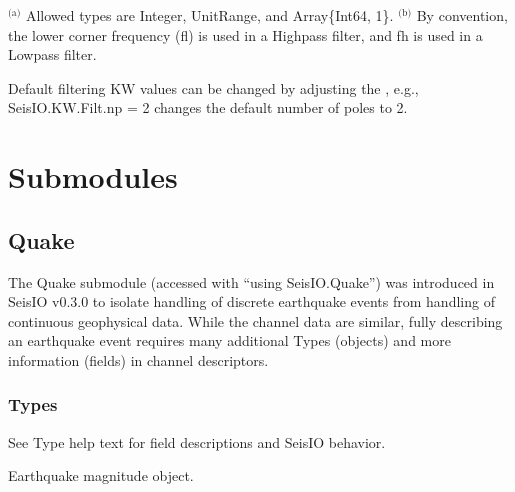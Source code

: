 \documentclass[letterpaper,11pt,english]{sphinxmanual}
\begin{document}
$^{\text{(a)}}$  Allowed types are Integer, UnitRange, and Array\{Int64, 1\}.
$^{\text{(b)}}$  By convention, the lower corner frequency (fl) is used in a Highpass
filter, and fh is used in a Lowpass filter.

Default filtering KW values can be changed by adjusting the {\hyperref[\detokenize{src/Appendices/keywords:dkw}]{}},
e.g., SeisIO.KW.Filt.np = 2 changes the default number of poles to 2.


\chapter{Submodules}
\label{\detokenize{index:submodules}}

\section{Quake}
\label{\detokenize{src/Submodules/quake:quake}}\label{\detokenize{src/Submodules/quake::doc}}
The Quake submodule (accessed with “using SeisIO.Quake”) was introduced in
SeisIO v0.3.0 to isolate handling of discrete earthquake events from handling
of continuous geophysical data. While the channel data are similar, fully
describing an earthquake event requires many additional Types (objects) and
more information (fields) in channel descriptors.


\subsection{Types}
\label{\detokenize{src/Submodules/quake:types}}
See Type help text for field descriptions and SeisIO behavior.

\begin{fulllineitems}
\label{\detokenize{src/Submodules/quake:EQMag}}
\end{fulllineitems}


Earthquake magnitude object.

\begin{fulllineitems}
\label{\detokenize{src/Submodules/quake:EQLoc}}
\end{fulllineitems}
\end{document}

